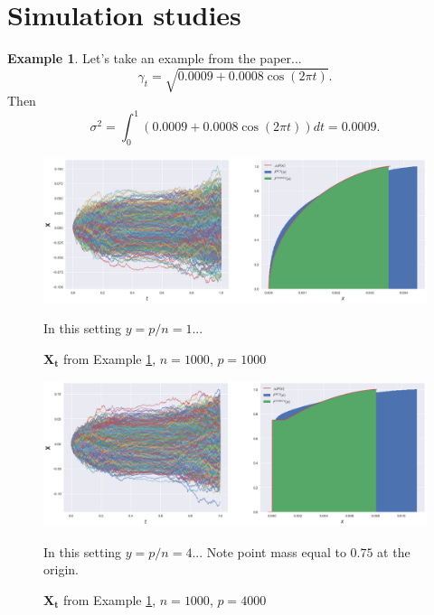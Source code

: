 \documentclass[a4paper,11pt]{article}
\theoremstyle{plain}
\theoremstyle{definition}
\newtheorem{exmp}[thm]{Example}
\begin{document}
    
    \pagebreak
    \part{Simulation studies}
    
    \begin{exmp} \label{SimCos}
    	Let's take an example from the paper...
    	\[ \gamma_t = \sqrt{0.0009 + 0.0008 \cos(2 \pi t)}. \]
    	Then
    	\[ \sigma^2 = \int_{0}^{1}(0.0009 + 0.0008 \cos(2 \pi t)) dt = 0.0009. \]
    \end{exmp}
    
    \begin{figure}
    	\begin{center} \centering
    		\includegraphics[scale=0.4]{XCos}
    		\caption{ $\mathbf{X_t}$ from Example \ref{SimCos}, $n = 1000$, $p=1000$ }
    		\smallskip
    		\small
    		In this setting $y = p/n = 1$...
    	\end{center}
    \end{figure}
    
    \begin{figure}
    	\begin{center} \centering
    		\includegraphics[scale=0.4]{XCos2}
    		\caption{ $\mathbf{X_t}$ from Example \ref{SimCos}, $n = 1000$, $p=4000$ }
    		\smallskip
    		\small
    		In this setting $y = p/n = 4$...
    		Note point mass equal to $0.75$ at the origin.
    	\end{center}
    \end{figure}
    
\end{document}

